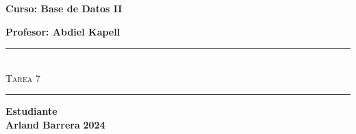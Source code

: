 \begin{titlepage}
\begin{center}
      {\Large \textbf{Curso: Base de Datos II}}\medskip
      
      {\Large \textbf{Profesor: Abdiel Kapell}}

      \rule{\linewidth}{0.75mm}\\
          {\Large \textsc{Tarea 7}} 
      \rule{\linewidth}{0.75mm}\medskip

      {\Large \textbf{Estudiante}}\\
      \vspace{5mm}
      {\Large \textbf{Arland Barrera}}
      \vfill
      {\Huge \textbf{2024}}

  \end{center}
\end{titlepage}